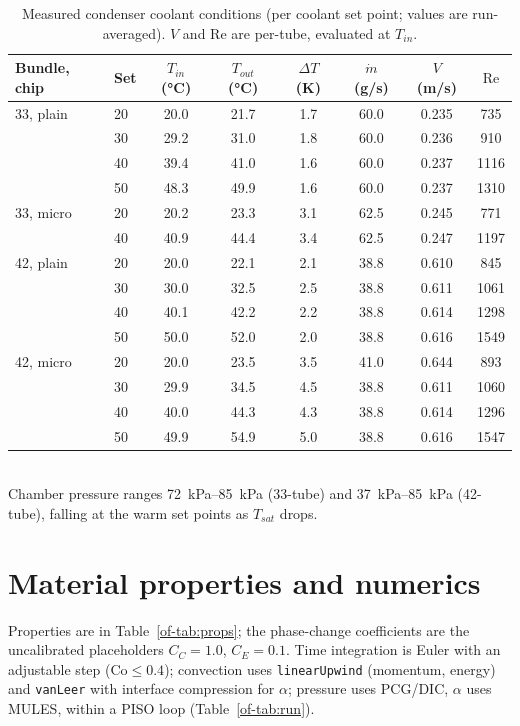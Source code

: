\documentclass[11pt]{article}
\begin{document}
\begin{table}[H]
\centering\caption{Measured condenser coolant conditions (per coolant set point; values
are run-averaged). $V$ and $\mathrm{Re}$ are per-tube, evaluated at $T_{in}$.}
\label{of-tab:coolant}
\footnotesize
\begin{tabular}{llcccccc}
\toprule
Bundle, chip & Set & $T_{in}$ (\si{\celsius}) & $T_{out}$ (\si{\celsius}) &
$\Delta T$ (K) & $\dot m$ (g/s) & $V$ (m/s) & $\mathrm{Re}$\\
\midrule
33, plain & 20 & 20.0 & 21.7 & 1.7 & 60.0 & 0.235 & 735\\
          & 30 & 29.2 & 31.0 & 1.8 & 60.0 & 0.236 & 910\\
          & 40 & 39.4 & 41.0 & 1.6 & 60.0 & 0.237 & 1116\\
          & 50 & 48.3 & 49.9 & 1.6 & 60.0 & 0.237 & 1310\\
33, micro & 20 & 20.2 & 23.3 & 3.1 & 62.5 & 0.245 & 771\\
          & 40 & 40.9 & 44.4 & 3.4 & 62.5 & 0.247 & 1197\\
42, plain & 20 & 20.0 & 22.1 & 2.1 & 38.8 & 0.610 & 845\\
          & 30 & 30.0 & 32.5 & 2.5 & 38.8 & 0.611 & 1061\\
          & 40 & 40.1 & 42.2 & 2.2 & 38.8 & 0.614 & 1298\\
          & 50 & 50.0 & 52.0 & 2.0 & 38.8 & 0.616 & 1549\\
42, micro & 20 & 20.0 & 23.5 & 3.5 & 41.0 & 0.644 & 893\\
          & 30 & 29.9 & 34.5 & 4.5 & 38.8 & 0.611 & 1060\\
          & 40 & 40.0 & 44.3 & 4.3 & 38.8 & 0.614 & 1296\\
          & 50 & 49.9 & 54.9 & 5.0 & 38.8 & 0.616 & 1547\\
\bottomrule
\end{tabular}\\[2pt]
\footnotesize Chamber pressure ranges \SIrange{72}{85}{kPa} (33-tube) and
\SIrange{37}{85}{kPa} (42-tube), falling at the warm set points as $T_{sat}$ drops.
\end{table}

\section{Material properties and numerics}
\label{of-sec:numerics}
Properties are in Table~\ref{of-tab:props}; the phase-change coefficients are the
uncalibrated placeholders $C_C=1.0$, $C_E=0.1$. Time integration is Euler with an
adjustable step ($\mathrm{Co}\le0.4$); convection uses \texttt{linearUpwind} (momentum,
energy) and \texttt{vanLeer} with interface compression for $\alpha$; pressure uses
PCG/DIC, $\alpha$ uses MULES, within a PISO loop (Table~\ref{of-tab:run}).
\end{document}
